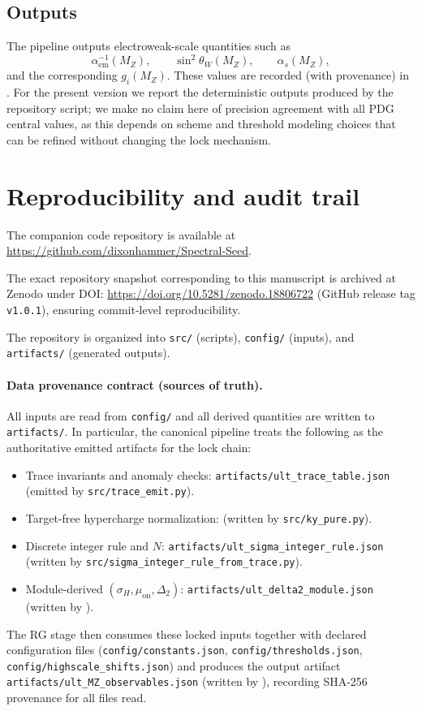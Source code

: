 \documentclass[11pt]{article}
\begin{document}
\subsection{Outputs}
The pipeline outputs electroweak-scale quantities such as
\begin{equation}
\alpha_{\mathrm{em}}^{-1}(M_Z),\qquad \sin^2\theta_W(M_Z),\qquad \alpha_s(M_Z),
\end{equation}
and the corresponding $g_i(M_Z)$. These values are recorded (with provenance) in \texttt{}. For the present version we report the deterministic outputs produced by the repository script; we make no claim here of precision agreement with all PDG central values, as this depends on scheme and threshold modeling choices that can be refined without changing the lock mechanism.

\section{Reproducibility and audit trail}
The companion code repository is available at \url{https://github.com/dixonhammer/Spectral-Seed}.

The exact repository snapshot corresponding to this manuscript is archived at Zenodo under DOI: \url{https://doi.org/10.5281/zenodo.18806722} (GitHub release tag \texttt{v1.0.1}), ensuring commit-level reproducibility.

The repository is organized into \texttt{src/} (scripts), \texttt{config/} (inputs), and \texttt{artifacts/} (generated outputs).

\paragraph{Data provenance contract (sources of truth).}
All inputs are read from \texttt{config/} and all derived quantities are written to \texttt{artifacts/}. In particular, the canonical pipeline treats the following as the authoritative emitted artifacts for the lock chain:
\begin{itemize}
  \item Trace invariants and anomaly checks: \texttt{artifacts/ult\_trace\_table.json} (emitted by \texttt{src/trace\_emit.py}).
  \item Target-free hypercharge normalization: \texttt{} (written by \texttt{src/ky\_pure.py}).
  \item Discrete integer rule and $N$: \texttt{artifacts/ult\_sigma\_integer\_rule.json} (written by \texttt{src/sigma\_integer\_rule\_from\_trace.py}).
  \item Module-derived $(\sigma_H,\mu_{\mathrm{on}},\Delta_2)$: \texttt{artifacts/ult\_delta2\_module.json} (written by \texttt{}).
\end{itemize}
The RG stage then consumes these locked inputs together with declared configuration files
(\texttt{config/constants.json}, \texttt{config/thresholds.json}, \texttt{config/highscale\_shifts.json})
and produces the output artifact \texttt{artifacts/ult\_MZ\_observables.json} (written by \texttt{}), recording SHA-256 provenance for all files read.
\end{document}
